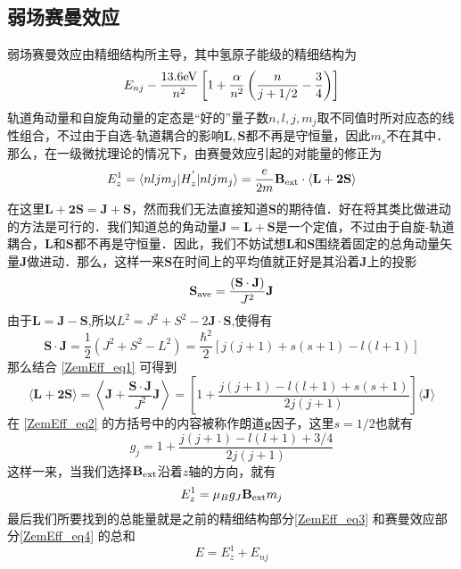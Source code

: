 \subsection{弱场赛曼效应}
弱场赛曼效应由精细结构所主导，其中氢原子能级的精细结构为
\begin{equation}\label{ZemEff_eq3}
E_{nj}-\frac{13.6\rm{eV}}{n^2}\left[1+\frac{\alpha}{n^2}\left(\frac{n}{j+1/2}-\frac{3}{4}\right)\right]
\end{equation}
轨道角动量和自旋角动量的定态是“好的”量子数$n,l,j,m_j$取不同值时所对应态的线性组合，不过由于自选-轨道耦合的影响$\mathbf{L,S}$都不再是守恒量，因此$m_s$不在其中．那么，在一级微扰理论的情况下，由赛曼效应引起的对能量的修正为
$$
E_z^{1}=\langle nljm_j|H_z^{'}|nljm_j\rangle=\frac{e}{2m}\mathbf{B}_{\rm{ext}}\cdot\langle\mathbf{L+2S}\rangle
$$
在这里$\mathbf{L+2S=J+S}$，然而我们无法直接知道$\mathbf{S}$的期待值．好在将其类比做进动的方法是可行的．我们知道总的角动量$\mathbf{J=L+S}$是一个定值，不过由于自旋-轨道耦合，$\mathbf{L}$和$\mathbf{S}$都不再是守恒量．因此，我们不妨试想$\mathbf{L}$和$\mathbf{S}$围绕着固定的总角动量矢量$\mathbf{J}$做进动．那么，这样一来$\mathbf{S}$在时间上的平均值就正好是其沿着$\mathbf{J}$上的投影
\begin{equation}\label{ZemEff_eq1}
\mathbf{S}_{\rm{ave}}=\frac{(\mathbf{S\cdot J})}{J^2}\mathbf{J}
\end{equation}
由于$\mathbf{L=J-S}$,所以$L^2=J^2+S^2-2\mathbf{J\cdot S}$,使得有
\begin{equation}
\mathbf{S\cdot J}=\frac{1}{2}(J^2+S^2-L^2)=\frac{\hbar^2}{2}[j(j+1)+s(s+1)-l(l+1)]
\end{equation}
那么结合 \autoref{ZemEff_eq1} 可得到
\begin{equation}\label{ZemEff_eq2}
\langle \mathbf{L+2S}\rangle =\left\langle \mathbf{J}+\frac{\mathbf{S\cdot J}}{J^2}\mathbf{J}\right\rangle=\left[1+\frac{j(j+1)-l(l+1)+s(s+1)}{2j(j+1)}\right]\langle\mathbf{J}\rangle
\end{equation}
在 \autoref{ZemEff_eq2} 的方括号中的内容被称作朗道$\mathbf{g}$因子，这里$s=1/2$也就有
\begin{equation}
g_j=1+\frac{j(j+1)-l(l+1)+3/4}{2j(j+1)}
\end{equation}
这样一来，当我们选择$\mathbf{B}_{\rm{ext}}$沿着$z$轴的方向，就有
\begin{equation}\label{ZemEff_eq4}
E^1_z =\mu_Bg_J\mathbf{B}_{\rm{ext}}m_j
\end{equation}
最后我们所要找到的总能量就是之前的精细结构部分\autoref{ZemEff_eq3} 和赛曼效应部分\autoref{ZemEff_eq4} 的总和
\begin{equation}
E=E_z^1+E_{nj}
\end{equation}
